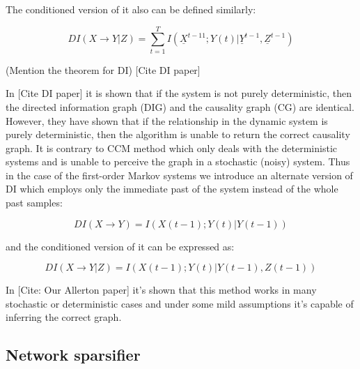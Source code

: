 \documentclass[10pt,oneside]{article}\usepackage[]{graphicx}\usepackage[]{color}
\begin{document}
The conditioned version of it also can be defined similarly:

\begin{equation}
DI(X\rightarrow Y|Z)=\sum_{t=1}^T I(\underline{X}^{t-11}; Y(t)|\underline{Y}^{t-1},\underline{Z}^{t-1})
\end{equation}

(Mention the theorem for DI) [Cite DI paper]

In [Cite DI paper] it is shown that if the system is not purely deterministic, then the directed information graph (DIG) and the causality graph (CG) are identical. However, they have shown that if the relationship in the dynamic system is purely deterministic, then the algorithm is unable to return the correct causality graph. It is contrary to CCM method which only deals with the deterministic systems and is unable to perceive the graph in a stochastic (noisy) system.
Thus in the case of the first-order Markov systems we introduce an alternate version of DI which employs only the immediate past of the system instead of the whole past samples:

\begin{equation}
DI(X\rightarrow Y)= I \left( X(t-1); Y(t)|Y(t-1) \right)
\end{equation}

and the conditioned version of it can be expressed as:

\begin{equation}
DI(X\rightarrow Y|Z)= I \left( X(t-1); Y(t)|Y(t-1),Z(t-1) \right)
\end{equation}

In [Cite: Our Allerton paper] it's shown that this method works in many stochastic or deterministic cases and under some mild assumptions it's capable of inferring the correct graph.

\subsection{Network sparsifier}
%
%
\end{document}
